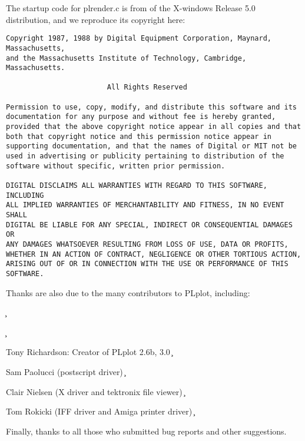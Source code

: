 The startup code for plrender.c is from  of the X-windows
Release 5.0 distribution, and we reproduce its copyright here:
\begin{verbatim}
Copyright 1987, 1988 by Digital Equipment Corporation, Maynard, Massachusetts,
and the Massachusetts Institute of Technology, Cambridge, Massachusetts.

                        All Rights Reserved

Permission to use, copy, modify, and distribute this software and its 
documentation for any purpose and without fee is hereby granted, 
provided that the above copyright notice appear in all copies and that
both that copyright notice and this permission notice appear in 
supporting documentation, and that the names of Digital or MIT not be
used in advertising or publicity pertaining to distribution of the
software without specific, written prior permission.  

DIGITAL DISCLAIMS ALL WARRANTIES WITH REGARD TO THIS SOFTWARE, INCLUDING
ALL IMPLIED WARRANTIES OF MERCHANTABILITY AND FITNESS, IN NO EVENT SHALL
DIGITAL BE LIABLE FOR ANY SPECIAL, INDIRECT OR CONSEQUENTIAL DAMAGES OR
ANY DAMAGES WHATSOEVER RESULTING FROM LOSS OF USE, DATA OR PROFITS,
WHETHER IN AN ACTION OF CONTRACT, NEGLIGENCE OR OTHER TORTIOUS ACTION,
ARISING OUT OF OR IN CONNECTION WITH THE USE OR PERFORMANCE OF THIS
SOFTWARE.
\end{verbatim}

Thanks are also due to the many contributors to PLplot, including:

\c \begin{description}
\c \item Tony Richardson: Creator of PLplot 2.6b, 3.0
\c \item Sam Paolucci (postscript driver)
\c \item Clair Nielsen (X driver and tektronix file viewer)
\c \item Tom Rokicki (IFF driver and Amiga printer driver)
\c \end{description}

Finally, thanks to all those who submitted bug reports and other
suggestions.
